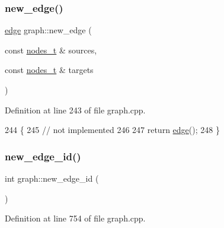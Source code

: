 \subsubsection{\texorpdfstring{new\+\_\+edge()}{new\_edge()}\hspace{0.1cm}{\footnotesize\ttfamily [2/2]}}
{\footnotesize\ttfamily \mbox{\hyperlink{classedge}{edge}} graph\+::new\+\_\+edge (\begin{DoxyParamCaption}\item[{const \mbox{\hyperlink{edge_8h_a22ac17689106ba21a84e7bc54d1199d6}{nodes\+\_\+t}} \&}]{sources,  }\item[{const \mbox{\hyperlink{edge_8h_a22ac17689106ba21a84e7bc54d1199d6}{nodes\+\_\+t}} \&}]{targets }\end{DoxyParamCaption})\hspace{0.3cm}{\ttfamily [virtual]}}



Definition at line 243 of file graph.\+cpp.


\begin{DoxyCode}
244 \{
245     \textcolor{comment}{// not implemented}
246 
247     \textcolor{keywordflow}{return} \mbox{\hyperlink{classedge}{edge}}();
248 \}
\end{DoxyCode}
\mbox{\label{classgraph_a3f3121c481746ab0a19eb187da5c0246}} 
\subsubsection{\texorpdfstring{new\+\_\+edge\+\_\+id()}{new\_edge\_id()}}
{\footnotesize\ttfamily int graph\+::new\+\_\+edge\+\_\+id (\begin{DoxyParamCaption}{ }\end{DoxyParamCaption})\hspace{0.3cm}{\ttfamily [private]}}



Definition at line 754 of file graph.\+cpp.


